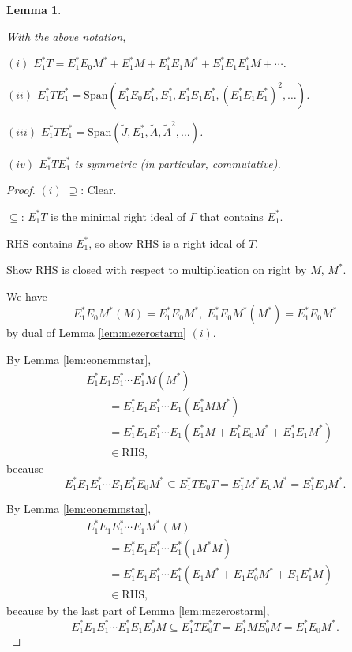 \documentclass[
]{book}
\newtheorem{lemma}{Lemma}[chapter]
\theoremstyle{definition}
\theoremstyle{definition}
\theoremstyle{definition}
\theoremstyle{definition}
\theoremstyle{remark}
\begin{document}
\begin{lemma}
\protect\hypertarget{lem:e1starte1star}{}\label{lem:e1starte1star}

With the above notation,

\((i)\) \(E^*_1T = E^*_1E_0M^* + E^*_1M + E^*_1E_1M^* + E^*_1E_1E^*_1M + \cdots\).

\((ii)\) \(E^*_1TE^*_1 = \mathrm{Span}(E^*_1E_0E^*_1, E^*_1, E^*_1E_1E^*_1, (E^*_1E_1E^*_1)^2, \ldots)\).

\((iii)\) \(E^*_1TE^*_1 = \mathrm{Span}(\tilde{J}, E^*_1, \tilde{A}, \tilde{A}^2, \ldots )\).

\((iv)\) \(E^*_1TE^*_1\) is symmetric (in particular, commutative).

\end{lemma}

\begin{proof}
\leavevmode

\((i)\) \(\supseteq\): Clear.

\(\subseteq\): \(E^*_1T\) is the minimal right ideal of \(\Gamma\) that contains \(E^*_1\).

\(\mathrm{RHS}\) contains \(E^*_1\), so show \(\mathrm{RHS}\) is a right ideal of \(T\).

Show \(\mathrm{RHS}\) is closed with respect to multiplication on right by \(M\), \(M^*\).

We have
\[E^*_1E_0M^*(M) = E^*_1E_0M^*, \; E^*_1E_0M^*(M^*) = E^*_1E_0M^*\]
by dual of Lemma \ref{lem:mezerostarm} \((i)\).

By Lemma \ref{lem:eonemmstar},
\begin{align}
& E^*_1E_1E^*_1\cdots E^*_1M(M^*)\\
& \qquad = E^*_1E_1E^*_1\cdots E_1(E^*_1MM^*)\\
& \qquad = E^*_1E_1E^*_1\cdots E_1(E^*_1M+E^*_1E_0M^* + E^*_1E_1M^*)\\
& \qquad \in \mathrm{RHS},
\end{align}
because
\[E^*_1E_1E^*_1\cdots E_1E^*_1E_0M^* \subseteq E^*_1TE_0T = E^*_1M^*E_0M^* = E^*_1E_0M^*.\]

By Lemma \ref{lem:eonemmstar},
\begin{align}
& E^*_1E_1E^*_1\cdots E_1M^*(M)\\
& \qquad = E^*_1E_1E^*_1\cdots E^*_1(_1M^*M)\\
& \qquad = E^*_1E_1E^*_1\cdots E^*_1(E_1M^*+E_1E^*_0M^* + E_1E^*_1M)\\
& \qquad \in \mathrm{RHS},
\end{align}
because by the last part of Lemma \ref{lem:mezerostarm},
\[E^*_1E_1E^*_1\cdots E^*_1E_1E^*_0M \subseteq E^*_1TE^*_0T = E^*_1ME^*_0M = E^*_1E_0M^*.\]


\end{proof}
\end{document}
